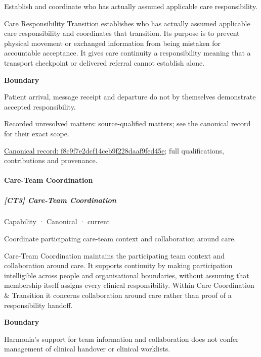 Establish and coordinate who has actually assumed applicable care responsibility.



Care Responsibility Transition establishes who has actually assumed applicable care responsibility and coordinates that transition. Its purpose is to prevent physical movement or exchanged information from being mistaken for accountable acceptance. It gives care continuity a responsibility meaning that a transport checkpoint or delivered referral cannot establish alone.



\textbf{Boundary}



Patient arrival, message receipt and departure do not by themselves demonstrate accepted responsibility.


{\small Recorded unresolved matters: source-qualified matters; see the canonical record for their exact scope.}\par
{\footnotesize \href{../../../../continuum/strategy/capability/f8c9f7e2dcf14ceb9f228daaf9fed45e.md}{Canonical record: f8c9f7e2dcf14ceb9f228daaf9fed45e}; full qualifications, contributions and provenance.}\par
\paragraph{Care-Team Coordination}

\subparagraph{[CT3] Care-Team Coordination}

\label{element:bbd138aab70d4b06b43662fb3f5373db}
{\small Capability · Canonical · current}\par

Coordinate participating care-team context and collaboration around care.



Care-Team Coordination maintains the participating team context and collaboration around care. It supports continuity by making participation intelligible across people and organisational boundaries, without assuming that membership itself assigns every clinical responsibility. Within Care Coordination \& Transition it concerns collaboration around care rather than proof of a responsibility handoff.



\textbf{Boundary}



Harmonia's support for team information and collaboration does not confer management of clinical handover or clinical worklists.


